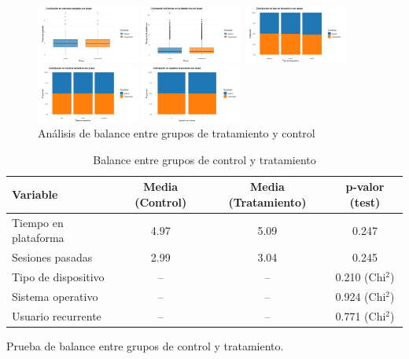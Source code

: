 \documentclass[conference]{IEEEtran}
\begin{document}
\begin{figure}
    \centering
    \includegraphics[width=0.3\textwidth]{figures/21.png}

    \includegraphics[width=0.3\textwidth]{figures/22.png}

    \includegraphics[width=0.3\textwidth]{figures/23.png}

    \includegraphics[width=0.3\textwidth]{figures/24.png}

    \includegraphics[width=0.3\textwidth]{figures/25.png}


    \caption{Análisis de balance entre grupos de tratamiento y control}
    \label{fig:balance}
\end{figure}

\begin{table}[H]
\ssmall
\centering
\caption{Balance entre grupos de control y tratamiento}
\label{tab:balance}
\begin{tabular}{lccc}
\hline
\textbf{Variable} & \textbf{Media (Control)} & \textbf{Media (Tratamiento)} & \textbf{p-valor (test)} \\ 
\hline
Tiempo en plataforma & 4.97 & 5.09 & 0.247 \\
Sesiones pasadas     & 2.99 & 3.04 & 0.245 \\
Tipo de dispositivo  & --   & --   & 0.210 (Chi$^2$) \\
Sistema operativo    & --   & --   & 0.924 (Chi$^2$) \\
Usuario recurrente   & --   & --   & 0.771 (Chi$^2$) \\
\hline
\end{tabular}

\hfill \break
Prueba de balance entre grupos de control y tratamiento. 
\end{table}
\end{document}
